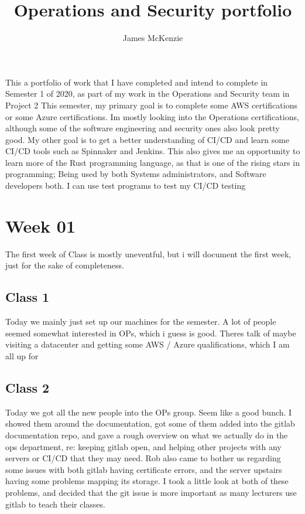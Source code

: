 \documentclass{article}
\begin{document}
\title{Operations and Security portfolio}
\author{James McKenzie}

\maketitle
This a portfolio of work that I have completed and intend to complete in Semester 1 of 2020, as part of my work in the 
Operations and Security team in Project 2
\medskip
This semester, my primary goal is to complete some AWS certifications or some Azure certifications. Im mostly looking into the 
Operations certifications, although some of the software engineering and security ones also look pretty good. My other goal
is to get a better understanding of CI/CD and learn some CI/CD tools such as Spinnaker and Jenkins. This also gives me an opportunity
to learn more of the Rust programming language, as that is one of the rising stars in programming; Being used by both Systems administrators,
and Software developers both. I can use test programs to test my CI/CD testing


\section{Week 01}
The first week of Class is mostly uneventful, but i will document the first week,  just for the sake of completeness. 


\subsection{Class 1}

Today we mainly just set up our machines for the semester. A lot of people seemed somewhat interested in OPs, which i guess is good.
Theres talk of maybe visiting a datacenter and getting some AWS / Azure qualifications, which I am all up for

\subsection{Class 2}
Today we got all the new people into the OPs group. Seem like a good bunch. I showed them around the documentation, got some of them added
into the gitlab documentation repo, and gave a rough overview on what we actually do in the ops department, re: keeping gitlab open, and helping
other projects with any servers or CI/CD that they may need. Rob also came to bother us regarding some issues with both gitlab having certificate
errors, and the server upstairs having some problems mapping its storage. I took a little look at both of these problems, and decided that 
the git issue is more important as many lecturers use gitlab to teach their classes.
\end{document}
